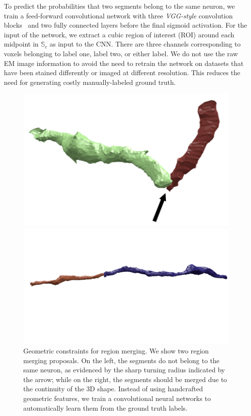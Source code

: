 To predict the probabilities that two segments belong to the same neuron, we train a feed-forward convolutional network with three \textit{VGG-style} convolution blocks~\cite{chatfield2014return} and two fully connected layers before the final sigmoid activation. 
For the input of the network, we extract a cubic region of interest (ROI) around each midpoint in $\mathbb{S}_c$ as input to the CNN. 
There are three channels corresponding to voxels belonging to label one, label two, or either label.
We do not use the raw EM image information to avoid the need to retrain the network on datasets that have been stained differently or imaged at different resolution. 
This reduces the need for generating costly manually-labeled ground truth. 
\begin{figure}[t]
	\begin{minipage}{0.4\linewidth}
		\includegraphics[width=\linewidth]{./figures/constraint_error.png}
	\end{minipage}
	\hfill
	\begin{minipage}{0.55\linewidth}
		\includegraphics[width=\linewidth]{./figures/constraint_success.png}
	\end{minipage}
	\caption{Geometric constraints for region merging. We show two region merging proposals. On the left, the segments do not belong to the same neuron, as evidenced by the sharp turning radius indicated by the arrow; while on the right, the segments should be merged due to the continuity of the 3D shape. Instead of using handcrafted geometric features, we train a convolutional neural networks to automatically learn them from the ground truth labels.}
	\label{fig:turn-radii}
\end{figure}

